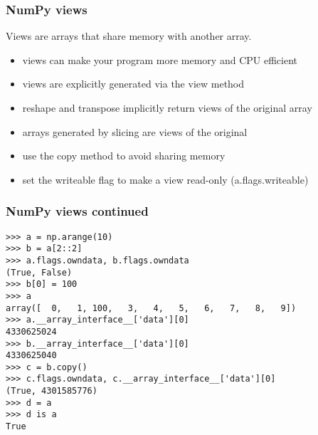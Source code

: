 \documentclass[10pt]{beamer}
\begin{document}
\begin{frame}[fragile]
\frametitle{NumPy views}
Views are arrays that share memory with another array.

\begin{itemize}
\item views can make your program more memory and CPU efficient
\item views are explicitly generated via the view method
\item reshape and transpose implicitly return views of the original array
\item arrays generated by slicing are views of the original
\item use the copy method to avoid sharing memory
\item set the writeable flag to make a view read-only (a.flags.writeable)
\end{itemize}
\end{frame}

\begin{frame}[fragile]
\frametitle{NumPy views continued}
\vspace{2mm}
\verb|>>> a = np.arange(10)|\\
\pause
\verb|>>> b = a[2::2]|\\
\pause
\verb|>>> a.flags.owndata, b.flags.owndata|\\
\verb|(True, False)|\\
\pause
\verb|>>> b[0] = 100|\\
\pause
\verb|>>> a|\\
\verb|array([  0,   1, 100,   3,   4,   5,   6,   7,   8,   9])|\\
\pause
\verb|>>> a.__array_interface__['data'][0]|\\
\verb|4330625024|\\
\pause
\verb|>>> b.__array_interface__['data'][0]|\\
\verb|4330625040|\\
\pause
\verb|>>> c = b.copy()|\\
\pause
\verb|>>> c.flags.owndata, c.__array_interface__['data'][0]|\\
\verb|(True, 4301585776)|\\
\pause
\verb|>>> d = a|\\
\pause
\verb|>>> d is a|\\
\verb|True|\\

\end{frame}
\end{document}
